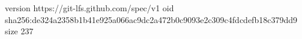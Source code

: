 version https://git-lfs.github.com/spec/v1
oid sha256:de324a2358b1b41e925a066ac9dc2a472b0c9093e2c309c4fdcdefb18c379dd9
size 237
